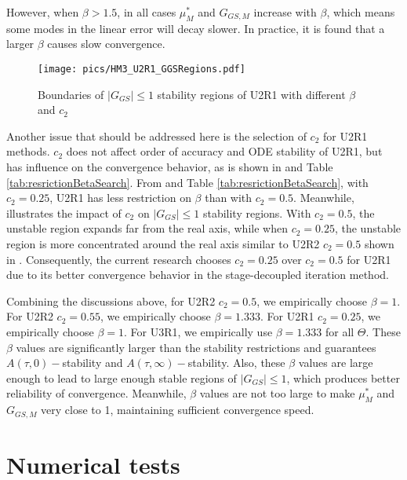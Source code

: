 However, when $\beta>1.5$, in all cases $\mu^*_{M}$ and $G_{GS,M}$ increase
with $\beta$, which means some modes in the linear error will
decay slower. In practice, it is found that a larger
$\beta$ causes slow convergence.

\begin{figure}[htbp]
    \centering
    \texttt{[image: pics/HM3\_U2R1\_GGSRegions.pdf]}
    \caption[]{Boundaries of $|G_{GS}|\leq1$ stability regions of U2R1 with different $\beta$ and $c_2$}
    \label{fig:HM3_U2R1_GGSRegions}
\end{figure}
Another issue that should be addressed here is the
selection of $c_2$ for U2R1 methods. $c_2$ does not
affect order of accuracy and ODE stability of U2R1, but
has influence on the convergence behavior, as is shown
in  and Table \ref{tab:resrictionBetaSearch}.
From  and Table \ref{tab:resrictionBetaSearch},
with $c_2=0.25$, U2R1 has less restriction on $\beta$ than with $c_2=0.5$.
Meanwhile,  illustrates the
impact of $c_2$ on $|G_{GS}|\leq1$ stability regions.
With $c_2=0.5$, the unstable region expands far from the real axis,
while when $c_2=0.25$, the unstable region is
more concentrated around the real axis similar to U2R2 $c_2=0.5$
shown in .
Consequently, the current research chooses $c_2=0.25$ over $c_2=0.5$
for U2R1 due to its better convergence behavior in
the stage-decoupled iteration method.



Combining the discussions above,
for U2R2 $c_2=0.5$, we empirically choose $\beta = 1$.
For U2R2 $c_2=0.55$, we empirically choose $\beta = 1.333$.
For U2R1 $c_2=0.25$, we empirically choose $\beta = 1$.
For U3R1, we empirically use $\beta = 1.333$ for all $\Theta$.
These $\beta$ values are significantly larger than the
stability restrictions and guarantees
$A(\tau,0)-$stability and
$A(\tau,\infty)-$stability.
Also, these  $\beta$ values are large enough to lead to large enough
stable regions of $|G_{GS}|\leq1$, which produces better reliability of convergence.
Meanwhile, $\beta$ values are not too large to make $\mu^*_{M}$ and $G_{GS,M}$ very
close to 1, maintaining sufficient convergence speed.



\section{Numerical tests}
\label{sec:Results}

